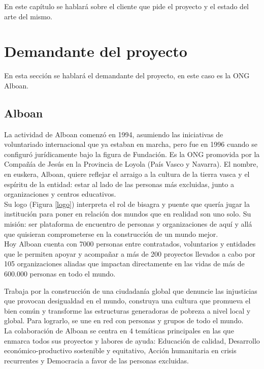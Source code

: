 En este capítulo se hablará sobre el cliente que pide el proyecto y el estado del arte del mismo.

\section{Demandante del proyecto}
En esta sección se hablará el demandante del proyecto, en este caso es la ONG Alboan.

\subsection{Alboan}

La actividad de Alboan\cite{alboan} comenzó en 1994, asumiendo las iniciativas de voluntariado
internacional que ya estaban en marcha, pero fue en 1996 cuando se configuró
jurídicamente bajo la figura de Fundación. Es la ONG promovida por la Compañía de Jesús en la Provincia de Loyola (País Vasco y Navarra). El nombre, en euskera, Alboan, quiere reflejar el arraigo a la cultura de la tierra vasca y el espíritu de la entidad: estar al lado de las personas más excluidas, junto a organizaciones y centros educativos.\\

Su logo (Figura \ref{logo}) interpreta el rol de bisagra y puente que quería jugar la institución para poner en relación dos mundos que en realidad son uno solo. Su misión: ser plataforma de encuentro de personas y organizaciones de aquí y allá que quisieran comprometerse en la construcción de un mundo mejor.\\

Hoy Alboan cuenta con 7000 personas entre contratados, voluntarios y entidades que le permiten apoyar y acompañar a más de 200 proyectos llevados a cabo por 105 organizaciones
aliadas que impactan directamente en las vidas de más de 600.000 personas en todo
el mundo.


Trabaja por la construcción de una ciudadanía global que denuncie las injusticias que provocan desigualdad en el mundo, construya una cultura que promueva el bien común y transforme las estructuras generadoras de pobreza a nivel local y global. Para lograrlo, se une en red con personas y grupos de todo el mundo.\\

La colaboración de Alboan se centra en 4 temáticas principales en las que enmarca todos sus proyectos y labores de ayuda: Educación de calidad, Desarrollo económico-productivo sostenible y equitativo, Acción humanitaria en crisis recurrentes y Democracia a favor de las personas excluidas.\\

